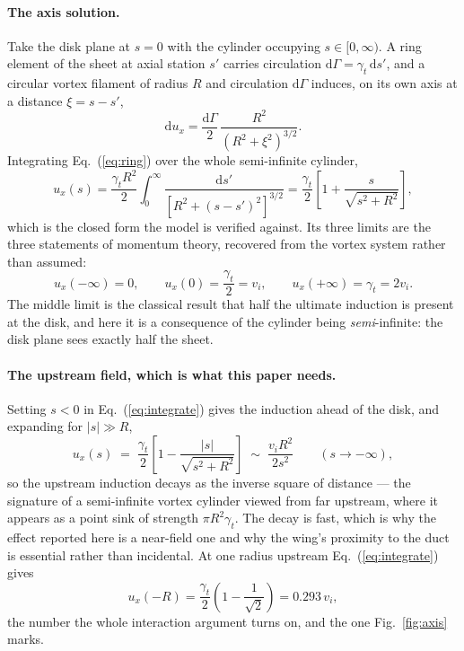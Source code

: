 \documentclass[submit]{aiaa-tc}%
\newcommand{\eqnref}[1]{(\ref{#1})}
\begin{document}
\paragraph{The axis solution.} Take the disk plane at $s = 0$ with the
cylinder occupying $s \in [0, \infty)$. A ring element of the sheet at
axial station $s'$ carries circulation $\mathrm{d}\Gamma = \gamma_t\,
\mathrm{d}s'$, and a circular vortex filament of radius $R$ and
circulation $\mathrm{d}\Gamma$ induces, on its own axis at a distance
$\xi = s - s'$,
%
\begin{equation}
  \label{eq:ring}
  \mathrm{d}u_x = \frac{\mathrm{d}\Gamma}{2}\,
                  \frac{R^2}{\left(R^2 + \xi^2\right)^{3/2}} .
\end{equation}
%
Integrating Eq.~\eqnref{eq:ring} over the whole semi-infinite cylinder,
%
\begin{equation}
  \label{eq:integrate}
  u_x(s) = \frac{\gamma_t R^2}{2}\int_{0}^{\infty}
           \frac{\mathrm{d}s'}{\left[R^2 + (s - s')^2\right]^{3/2}}
         = \frac{\gamma_t}{2}\left[1 + \frac{s}{\sqrt{s^2 + R^2}}\right],
\end{equation}
%
which is the closed form the model is verified against. Its three limits
are the three statements of momentum theory, recovered from the vortex
system rather than assumed:
%
\begin{equation}
  \label{eq:limits}
  u_x(-\infty) = 0, \qquad u_x(0) = \frac{\gamma_t}{2} = v_i, \qquad
  u_x(+\infty) = \gamma_t = 2 v_i .
\end{equation}
%
The middle limit is the classical result that half the ultimate induction
is present at the disk, and here it is a consequence of the cylinder being
\emph{semi}-infinite: the disk plane sees exactly half the sheet.

\paragraph{The upstream field, which is what this paper needs.} Setting
$s < 0$ in Eq.~\eqnref{eq:integrate} gives the induction ahead of the
disk, and expanding for $|s| \gg R$,
%
\begin{equation}
  \label{eq:upstream}
  u_x(s) \;=\; \frac{\gamma_t}{2}\left[1 - \frac{|s|}{\sqrt{s^2+R^2}}\right]
         \;\sim\; \frac{v_i R^2}{2 s^2}
         \qquad (s \to -\infty),
\end{equation}
%
so the upstream induction decays as the inverse square of distance --- the
signature of a semi-infinite vortex cylinder viewed from far upstream,
where it appears as a point sink of strength $\pi R^2 \gamma_t$. The decay
is fast, which is why the effect reported here is a near-field one and why
the wing's proximity to the duct is essential rather than incidental. At
one radius upstream Eq.~\eqnref{eq:integrate} gives
%
\begin{equation}
  \label{eq:oneradius}
  u_x(-R) = \frac{\gamma_t}{2}\left(1 - \frac{1}{\sqrt{2}}\right)
          = 0.293\,v_i ,
\end{equation}
%
the number the whole interaction argument turns on, and the one
Fig.~\ref{fig:axis} marks.
\end{document}
